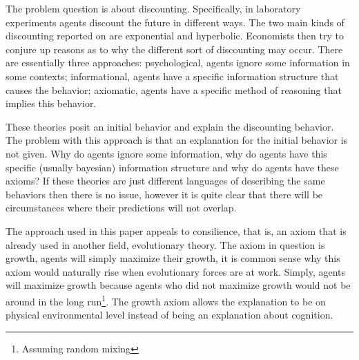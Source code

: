 The problem question is about discounting. Specifically, in laboratory experiments agents discount the future in different ways. The two main kinds of discounting reported on are exponential and hyperbolic. Economists then try to conjure up reasons as to why the different sort of discounting may occur. There are essentially three approaches: psychological, agents ignore some information in some contexts; informational, agents have a specific information structure that causes the behavior; axiomatic, agents have a specific method of reasoning that implies this behavior. 

These theories posit an initial behavior and explain the discounting behavior. The problem with this approach is that an explanation for the initial behavior is not given. Why do agents ignore some information, why do agents have this specific (usually bayesian) information structure and why do agents have these axioms? If these theories are just different languages of describing the same behaviors then there is no issue, however it is quite clear that there will be circumstances where their predictions will not overlap. 

The approach used in this paper appeals to consilience, that is, an axiom that is already used in another field, evolutionary theory. The axiom in question is growth, agents will simply maximize their growth, it is common sense why this axiom would naturally rise when evolutionary forces are at work. Simply, agents will maximize growth because agents who did not maximize growth would not be around in the long run\footnote{Assuming random mixing}. The growth axiom allows the explanation to be on physical environmental level instead of being an explanation about cognition. 



